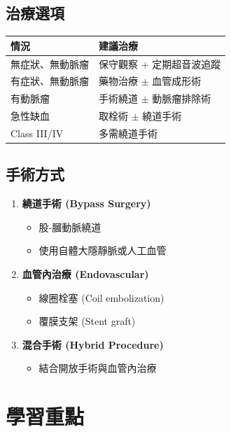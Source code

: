 \documentclass[12pt,a4paper]{article}
\begin{document}
\subsection{治療選項}

\begin{longtable}{p{5cm}p{9cm}}
\toprule
\textbf{情況} & \textbf{建議治療} \\
\midrule
\endfirsthead
\bottomrule
\endlastfoot
無症狀、無動脈瘤 & 保守觀察 + 定期超音波追蹤 \\
\midrule
有症狀、無動脈瘤 & 藥物治療 $\pm$ 血管成形術 \\
\midrule
有動脈瘤 & 手術繞道 $\pm$ 動脈瘤排除術 \\
\midrule
急性缺血 & 取栓術 $\pm$ 繞道手術 \\
\midrule
Class III/IV & 多需繞道手術 \\
\end{longtable}

\subsection{手術方式}

\begin{enumerate}
    \item \textbf{繞道手術 (Bypass Surgery)}
    \begin{itemize}
        \item 股-膕動脈繞道
        \item 使用自體大隱靜脈或人工血管
    \end{itemize}

    \item \textbf{血管內治療 (Endovascular)}
    \begin{itemize}
        \item 線圈栓塞 (Coil embolization)
        \item 覆膜支架 (Stent graft)
    \end{itemize}

    \item \textbf{混合手術 (Hybrid Procedure)}
    \begin{itemize}
        \item 結合開放手術與血管內治療
    \end{itemize}
\end{enumerate}

\section{學習重點}
\end{document}
